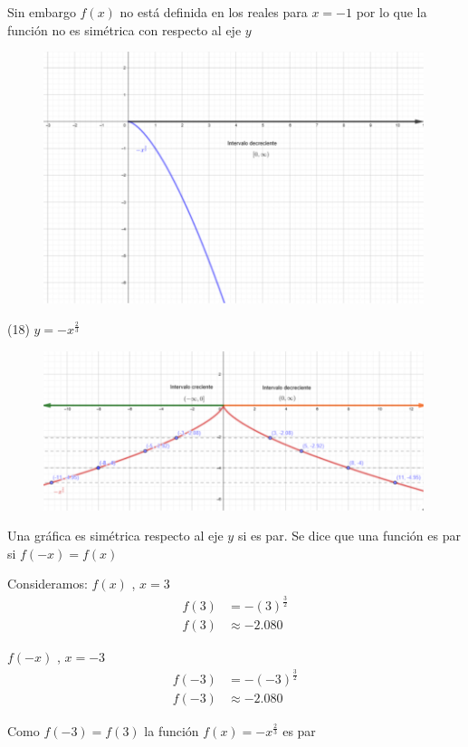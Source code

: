 \documentclass[12pt, letterpaper]{article}
\begin{document}
Sin embargo $f(x)$ no está definida en los reales para $x = -1$ por lo que la función no es simétrica con respecto al eje $y$  

\begin{figure}[h]
\centering
\includegraphics[width=30em]{crecedos}
\end{figure} 
\newpage

(18) $y= -x^{\frac{2}{3}}$

\begin{figure}[h]
\centering
\includegraphics[width=30em]{crecetres}
\end{figure}

Una gráfica es simétrica respecto al eje $y$ si es par. 
Se dice que una función es par si $f(-x)=f(x)$

Consideramos: $f(x)$ , $x = 3$
\begin{align*}
	f(3) &=  -(3)^{\frac{3}{2}}\\
	f(3) & \approx -2.080
\end{align*}

$f(-x)$ , $x = -3$
\begin{align*}
	f(-3) &=  -(-3)^{\frac{3}{2}}\\
	f(-3) & \approx -2.080
\end{align*}

Como $f(-3)= f(3)$ la función $f(x) = -x^{\frac{2}{3}}$ es par
\end{document}
